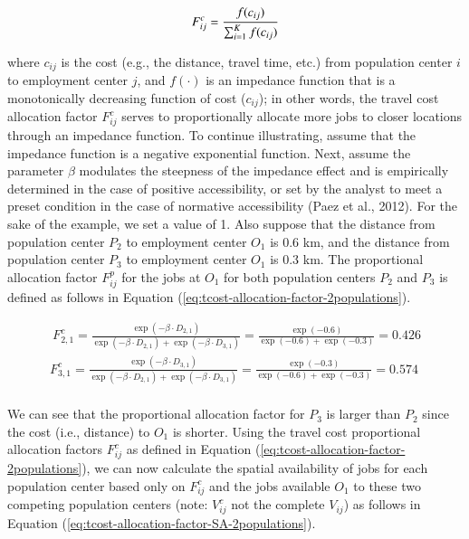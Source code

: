\documentclass[]{elsarticle} %
\begin{document}
\begin{equation}
\label{eq:tcost-alloc-factor}
F^c_{ij} = \frac{f(c_{ij})}{\sum_{i=1}^K f(c_{ij})}\\
\end{equation}

\noindent where \(c_{ij}\) is the cost (e.g., the distance, travel time,
etc.) from population center \(i\) to employment center \(j\), and
\(f(\cdot)\) is an impedance function that is a monotonically decreasing
function of cost (\(c_{ij}\)); in other words, the travel cost
allocation factor \(F^c_{ij}\) serves to proportionally allocate more
jobs to closer locations through an impedance function. To continue
illustrating, assume that the impedance function is a negative
exponential function. Next, assume the parameter \(\beta\) modulates the
steepness of the impedance effect and is empirically determined in the
case of positive accessibility, or set by the analyst to meet a preset
condition in the case of normative accessibility (Paez et al., 2012).
For the sake of the example, we set a value of 1. Also suppose that the
distance from population center \(P_2\) to employment center \(O_1\) is
0.6 km, and the distance from population center \(P_3\) to employment
center \(O_1\) is 0.3 km. The proportional allocation factor
\(F^p_{ij}\) for the jobs at \(O_1\) for both population centers \(P_2\)
and \(P_3\) is defined as follows in Equation
(\ref{eq:tcost-allocation-factor-2populations}).

\begin{equation}
\label{eq:tcost-allocation-factor-2populations}
\begin{array}{l}\
F^c_{2,1} = \frac{\exp(-\beta \cdot D_{2,1})}{\exp(-\beta \cdot D_{2,1}) + \exp(-\beta \cdot D_{3,1})} = \frac{\exp(-0.6)}{\exp(-0.6) + \exp(-0.3)} = 0.426\\
F^c_{3,1} = \frac{\exp(-\beta \cdot D_{3,1})}{\exp(-\beta \cdot D_{2,1}) + \exp(-\beta \cdot D_{3,1})}  = \frac{\exp(-0.3)}{\exp(-0.6) + \exp(-0.3)} = 0.574\\
\end{array}
\end{equation}

We can see that the proportional allocation factor for \(P_3\) is larger
than \(P_2\) since the cost (i.e., distance) to \(O_1\) is shorter.
Using the travel cost proportional allocation factors \(F^c_{ij}\) as
defined in Equation (\ref{eq:tcost-allocation-factor-2populations}), we
can now calculate the spatial availability of jobs for each population
center based only on \(F^c_{ij}\) and the jobs available \(O_1\) to
these two competing population centers (note: \(V^c_{ij}\) not the
complete \(V_{ij}\)) as follows in Equation
(\ref{eq:tcost-allocation-factor-SA-2populations}).
\end{document}
